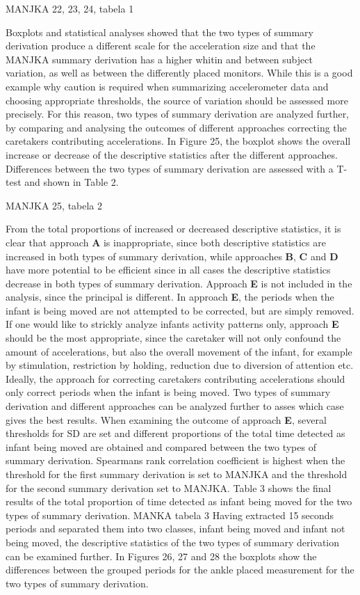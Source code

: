\documentclass{article}
\begin{document}
{MANJKA 22, 23, 24, tabela 1

Boxplots and statistical analyses showed that the two types of summary derivation produce a different scale for the acceleration size and that the MANJKA summary derivation has a higher whitin and between subject variation, as well as between the differently placed monitors. While this is a good example why caution is required when summarizing accelerometer data and choosing appropriate thresholds, the source of variation should be assessed more precisely. For this reason, two types of summary derivation are analyzed further, by comparing and analysing the outcomes of different approaches correcting the caretakers contributing accelerations. In Figure 25, the boxplot shows the overall increase or decrease of the descriptive statistics after the different approaches. Differences between the two types of summary derivation are assessed with a T-test and shown in Table 2.

MANJKA 25, tabela 2

From the total proportions of increased or decreased descriptive statistics, it is clear that approach \textbf{A} is inappropriate, since both descriptive statistics are increased in both types of summary derivation, while approaches  \textbf{B}, \textbf{C} and \textbf{D} have more potential to be efficient since in all cases the descriptive statistics decrease in both types of summary derivation. Approach \textbf{E} is not included in the analysis, since the principal is different. In approach \textbf{E}, the periods when the infant is being moved are not attempted to be corrected, but are simply removed. If one would like to strickly analyze infants activity patterns only, approach \textbf{E} should be the most appropriate, since the caretaker will not only confound the amount of accelerations, but also the overall movement of the infant, for example by stimulation, restriction by holding, reduction due to diversion of attention etc. Ideally, the approach for correcting caretakers contributing accelerations should only correct periods when the infant is being moved. Two types of summary derivation and different approaches can be analyzed further to asses which case gives the best results.
When examining the outcome of approach \textbf{E}, several thresholds for SD are set and different proportions of the total time detected as infant being moved are obtained and compared between the two types of summary derivation. Spearmans rank correlation coefficient is highest when the threshold for the first summary derivation is set to MANJKA and the threshold for the second summary derivation set to MANJKA. Table 3 shows the final results of the total proportion of time detected as infant being moved for the two types of summary derivation.
MANKA tabela 3
Having extracted 15 seconds periods and separated them into two classes, infant being moved and infant not being moved, the descriptive statistics of the two types of summary derivation can be examined further. In Figures 26, 27 and 28 the boxplots show the differences between the grouped periods for the ankle placed measurement for the two types of summary derivation.

}
\end{document}
